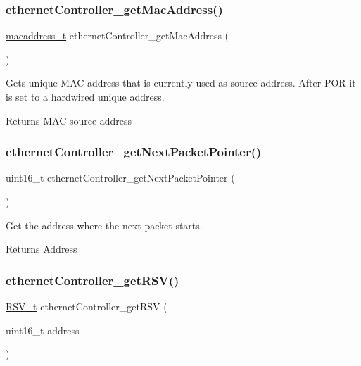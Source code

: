 \subsubsection{\texorpdfstring{ethernetController\_getMacAddress()}{ethernetController\_getMacAddress()}}
{\footnotesize\ttfamily \mbox{\hyperlink{group__ethernet_gacb865bcbf50a6c8cef05581bfabff373}{macaddress\+\_\+t}} ethernet\+Controller\+\_\+get\+Mac\+Address (\begin{DoxyParamCaption}{ }\end{DoxyParamCaption})}



Gets unique M\+AC address that is currently used as source address. After P\+OR it is set to a hardwired unique address. 

\begin{DoxyReturn}{Returns}
M\+AC source address 
\end{DoxyReturn}
\mbox{\label{group__data__reception_ga6155805a8511681932051b00a0032f9f}} 
\subsubsection{\texorpdfstring{ethernetController\_getNextPacketPointer()}{ethernetController\_getNextPacketPointer()}}
{\footnotesize\ttfamily uint16\+\_\+t ethernet\+Controller\+\_\+get\+Next\+Packet\+Pointer (\begin{DoxyParamCaption}{ }\end{DoxyParamCaption})}



Get the address where the next packet starts. 

\begin{DoxyReturn}{Returns}
Address 
\end{DoxyReturn}
\mbox{\label{group__data__reception_ga1d8cfd56b6020b891ba408c18789129c}} 
\subsubsection{\texorpdfstring{ethernetController\_getRSV()}{ethernetController\_getRSV()}}
{\footnotesize\ttfamily \mbox{\hyperlink{group__rsv_gaf7fd94a9424fccb0aafa846f27a43099}{R\+S\+V\+\_\+t}} ethernet\+Controller\+\_\+get\+R\+SV (\begin{DoxyParamCaption}\item[{uint16\+\_\+t}]{address }\end{DoxyParamCaption})}



